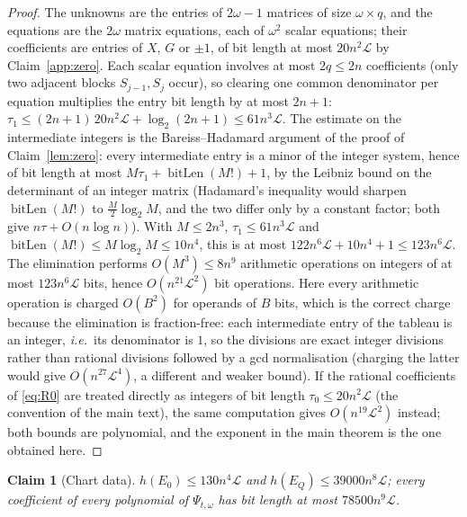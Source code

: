 \documentclass[journal]{IEEEtran}
\theoremstyle{plainn}
\newtheorem{claim}{Claim}
\theoremstyle{remark}
\begin{document}
\begin{proof}
The unknowns are the entries of $2\omega-1$ matrices of size $\omega\times q$, and the equations are
the $2\omega$ matrix equations, each of $\omega^2$ scalar equations; their coefficients are entries of
$X$, $G$ or $\pm1$, of bit length at most $20n^2\mathcal L$ by Claim~\ref{app:zero}. Each scalar
equation involves at most $2q\le2n$ coefficients (only two adjacent blocks $S_{j-1},S_j$ occur), so
clearing one common denominator per equation multiplies the entry bit length by at most $2n+1$:
$\tau_1\le(2n+1)\,20n^2\mathcal L+\log_2(2n+1)\le61n^3\mathcal L$. The estimate on the intermediate
integers is the Bareiss--Hadamard argument of the proof of Claim~\ref{lem:zero}: every intermediate
entry is a minor of the integer system, hence of bit length at most
$M\tau_1+\operatorname{bitLen}(M!)+1$, by the Leibniz bound on the determinant of an integer matrix
(Hadamard's inequality would sharpen $\operatorname{bitLen}(M!)$ to $\tfrac{M}{2}\log_2M$, and the two
differ only by a constant factor; both give $n\tau+O(n\log n)$). With $M\le2n^3$,
$\tau_1\le61n^3\mathcal L$ and $\operatorname{bitLen}(M!)\le M\log_2M\le10n^4$, this is at most
$122n^6\mathcal L+10n^4+1\le123n^6\mathcal L$. The
elimination performs $O(M^3)\le8n^9$ arithmetic operations on integers of at most
$123n^6\mathcal L$ bits, hence $O(n^{21}\mathcal L^2)$ bit operations. Here every arithmetic operation
is charged $O(B^2)$ for operands of $B$ bits, which is the correct charge because the elimination is
fraction-free: each intermediate entry of the tableau is an integer, \emph{i.e.}\ its denominator is
$1$, so the divisions are exact integer divisions rather than rational divisions followed by a gcd
normalisation (charging the latter would give $O(n^{27}\mathcal L^4)$, a different and weaker bound).
If the rational coefficients of
\eqref{eq:R0} are treated directly as integers of bit length $\tau_0\le20n^2\mathcal L$ (the convention
of the main text), the same computation gives $O(n^{19}\mathcal L^2)$ instead; both bounds are
polynomial, and the exponent in the main theorem is the one obtained here.
\end{proof}

\begin{claim}[Chart data]\label{app:chart}
$h(E_0)\le130n^4\mathcal L$ and $h(E_Q)\le39000n^8\mathcal L$; every coefficient of every polynomial
of $\Psi_{t,\omega}$ has bit length at most $78500n^9\mathcal L$.
\end{claim}
\end{document}
